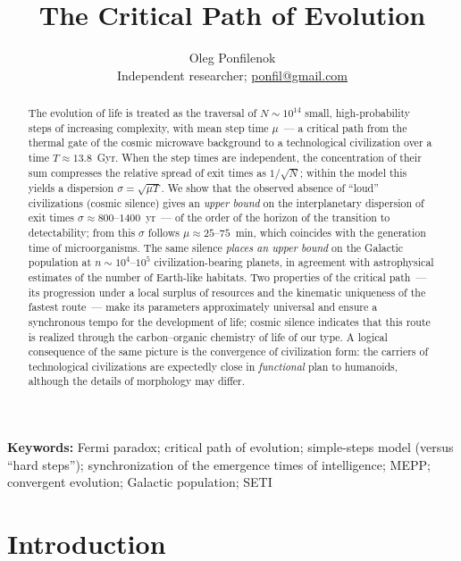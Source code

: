 \documentclass[11pt,a4paper]{article}
\title{\textbf{The Critical Path of Evolution}}
\author{%
  Oleg Ponfilenok\\[0.35em]%
  {\normalsize Independent researcher; \href{mailto:ponfil@gmail.com}{ponfil@gmail.com}}%
}
\date{}
\begin{document}
\maketitle

\begin{abstract}
The evolution of life is treated as the traversal of $N \sim 10^{14}$ small, high-probability steps of increasing complexity, with mean step time $\mu$~--- a critical path from the thermal gate of the cosmic microwave background to a technological civilization over a time $T \approx 13.8$~Gyr. When the step times are independent, the concentration of their sum compresses the relative spread of exit times as $1/\sqrt{N}$; within the model this yields a dispersion $\sigma = \sqrt{\mu T}$. We show that the observed absence of ``loud'' civilizations (cosmic silence) gives an \emph{upper bound} on the interplanetary dispersion of exit times $\sigma \approx 800$--$1400$~yr~--- of the order of the horizon of the transition to detectability; from this $\sigma$ follows $\mu \approx 25$--$75$~min, which coincides with the generation time of microorganisms. The same silence \emph{places an upper bound} on the Galactic population at $n \sim 10^4$--$10^5$ civilization-bearing planets, in agreement with astrophysical estimates of the number of Earth-like habitats. Two properties of the critical path~--- its progression under a local surplus of resources and the kinematic uniqueness of the fastest route~--- make its parameters approximately universal and ensure a synchronous tempo for the development of life; cosmic silence indicates that this route is realized through the carbon--organic chemistry of life of our type. A logical consequence of the same picture is the convergence of civilization form: the carriers of technological civilizations are expectedly close in \emph{functional} plan to humanoids, although the details of morphology may differ.
\end{abstract}

\noindent\textbf{Keywords:} Fermi paradox; critical path of evolution; simple-steps model (versus ``hard steps''); synchronization of the emergence times of intelligence; MEPP; convergent evolution; Galactic population; SETI

\section{Introduction}
\end{document}
